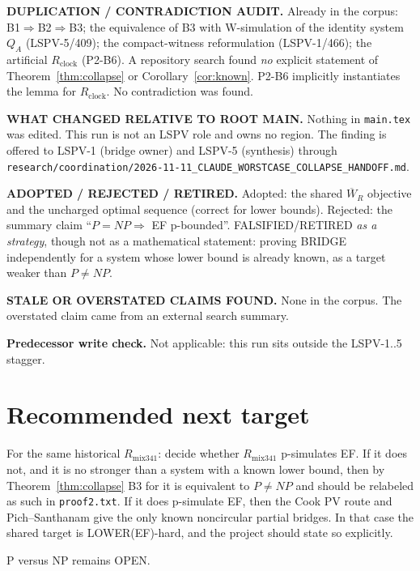 \documentclass[11pt]{article}
\theoremstyle{definition}\newtheorem{definition}[theorem]{Definition}
\begin{document}
\textbf{DUPLICATION / CONTRADICTION AUDIT.} Already in the corpus: B1$\Rightarrow$B2$\Rightarrow$B3; the equivalence of B3 with W-simulation of the identity system $Q_A$ (LSPV-5/409); the compact-witness reformulation (LSPV-1/466); the artificial $R_{\mathrm{clock}}$ (P2-B6). A repository search found \emph{no} explicit statement of Theorem~\ref{thm:collapse} or Corollary~\ref{cor:known}. P2-B6 implicitly instantiates the lemma for $R_{\mathrm{clock}}$. No contradiction was found.

\textbf{WHAT CHANGED RELATIVE TO ROOT MAIN.} Nothing in \texttt{main.tex} was edited. This run is not an LSPV role and owns no region. The finding is offered to LSPV-1 (bridge owner) and LSPV-5 (synthesis) through \texttt{research/coordination/2026-11-11\_CLAUDE\_WORSTCASE\_COLLAPSE\_HANDOFF.md}.

\textbf{ADOPTED / REJECTED / RETIRED.} Adopted: the shared $\overline W_R$ objective and the uncharged optimal sequence (correct for lower bounds). Rejected: the summary claim ``$P=NP\Rightarrow$ EF p-bounded''. FALSIFIED/RETIRED \emph{as a strategy}, though not as a mathematical statement: proving BRIDGE independently for a system whose lower bound is already known, as a target weaker than $P\ne NP$.

\textbf{STALE OR OVERSTATED CLAIMS FOUND.} None in the corpus. The overstated claim came from an external search summary.

\textbf{Predecessor write check.} Not applicable: this run sits outside the LSPV-1..5 stagger.

\section{Recommended next target}
For the same historical $R_{\mathrm{mix341}}$: decide whether $R_{\mathrm{mix341}}$ p-simulates EF. If it does not, and it is no stronger than a system with a known lower bound, then by Theorem~\ref{thm:collapse} B3 for it is equivalent to $P\ne NP$ and should be relabeled as such in \texttt{proof2.txt}. If it does p-simulate EF, then the Cook PV route and Pich--Santhanam give the only known noncircular partial bridges. In that case the shared target is LOWER(EF)-hard, and the project should state so explicitly.

\noindent P versus NP remains OPEN.
\end{document}
